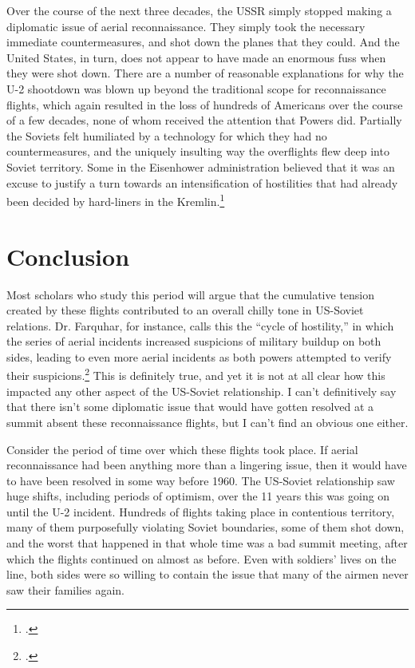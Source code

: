 \documentclass{report}
\begin{document}
\begin{refsegment}
Over the course of the next three decades, the USSR simply stopped making a diplomatic issue of aerial reconnaissance. They simply took the necessary immediate countermeasures, and shot down the planes that they could. And the United States, in turn, does not appear to have made an enormous fuss when they were shot down. There are a number of reasonable explanations for why the U-2 shootdown was blown up beyond the traditional scope for reconnaissance flights, which again resulted in the loss of hundreds of Americans over the course of a few decades, none of whom received the attention that Powers did. Partially the Soviets felt humiliated by a technology for which they had no countermeasures, and the uniquely insulting way the overflights flew deep into Soviet territory. Some in the Eisenhower administration believed that it was an excuse to justify a turn towards an intensification of hostilities that had already been decided by hard-liners in the Kremlin.\footcite[p.~328]{kistiakowsky_scientist_1976}

\section{Conclusion}
Most scholars who study this period will argue that the cumulative tension created by these flights contributed to an overall chilly tone in US-Soviet relations. Dr. Farquhar, for instance, calls this the ``cycle of hostility,'' in which the series of aerial incidents increased suspicions of military buildup on both sides, leading to even more aerial incidents as both powers attempted to verify their suspicions.\footcite[p.~43]{farquhar_aerial_2015} This is definitely true, and yet it is not at all clear how this impacted any other aspect of the US-Soviet relationship. I can't definitively say that there isn't some diplomatic issue that would have gotten resolved at a summit absent these reconnaissance flights, but I can't find an obvious one either.

Consider the period of time over which these flights took place. If aerial reconnaissance had been anything more than a lingering issue, then it would have to have been resolved in some way before 1960. The US-Soviet relationship saw huge shifts, including periods of optimism, over the 11 years this was going on until the U-2 incident. Hundreds of flights taking place in contentious territory, many of them purposefully violating Soviet boundaries, some of them shot down, and the worst that happened in that whole time was a bad summit meeting, after which the flights continued on almost as before. Even with soldiers' lives on the line, both sides were so willing to contain the issue that many of the airmen never saw their families again.


\end{refsegment}
\end{document}
